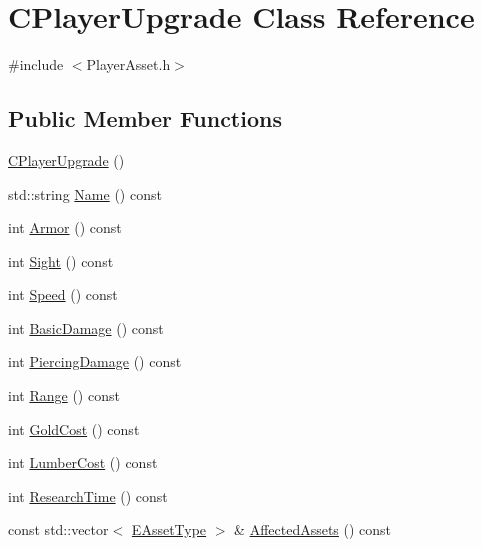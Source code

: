 \hypertarget{classCPlayerUpgrade}{}\section{C\+Player\+Upgrade Class Reference}
\label{classCPlayerUpgrade}


{\ttfamily \#include $<$Player\+Asset.\+h$>$}

\subsection*{Public Member Functions}
\begin{DoxyCompactItemize}
\item 
\hyperlink{classCPlayerUpgrade_a6873b0eb480cf1514bc67b14959e1bea}{C\+Player\+Upgrade} ()
\item 
std\+::string \hyperlink{classCPlayerUpgrade_a9030c62bc29150957f2fb6485ee9c01f}{Name} () const
\item 
int \hyperlink{classCPlayerUpgrade_a7717f1de7fc982320845b590def4846e}{Armor} () const
\item 
int \hyperlink{classCPlayerUpgrade_a893161e7735491cf1aa437ea5b23bd02}{Sight} () const
\item 
int \hyperlink{classCPlayerUpgrade_a9a282b069dc742c7f0ed46a6b4770370}{Speed} () const
\item 
int \hyperlink{classCPlayerUpgrade_a64268c0dbb2f87cb2e830d361c2f9233}{Basic\+Damage} () const
\item 
int \hyperlink{classCPlayerUpgrade_a80192c973e69a2bd3645c91ca103a40e}{Piercing\+Damage} () const
\item 
int \hyperlink{classCPlayerUpgrade_a4f2a0375a5a712e629e00da86727588c}{Range} () const
\item 
int \hyperlink{classCPlayerUpgrade_aabf9817c5a79f857c2633cb553c30e8a}{Gold\+Cost} () const
\item 
int \hyperlink{classCPlayerUpgrade_ac7ecd3365fd8b9b54fb38df815f31877}{Lumber\+Cost} () const
\item 
int \hyperlink{classCPlayerUpgrade_aa5d709df37ad2478336da2c77065cf73}{Research\+Time} () const
\item 
const std\+::vector$<$ \hyperlink{GameDataTypes_8h_a5600d4fc433b83300308921974477fec}{E\+Asset\+Type} $>$ \& \hyperlink{classCPlayerUpgrade_a5e9516439965028c758a7383c2957a6c}{Affected\+Assets} () const
\end{DoxyCompactItemize}

